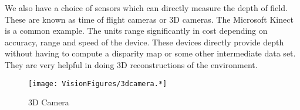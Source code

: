 We also have a choice of sensors which can directly measure the depth of
field. These are known as time of flight cameras or 3D cameras. The
Microsoft Kinect is a common example. The units range significantly in
cost depending on accuracy, range and speed of the device. These devices
directly provide depth without having to compute a disparity map or some
other intermediate data set. They are very helpful in doing 3D
reconstructions of the environment.

\begin{figure}
\centering
\texttt{[image: VisionFigures/3dcamera.*]}
\caption{3D Camera}
\end{figure}
